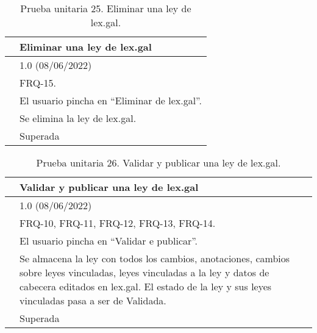 \begin{table}[H]
\begin{center}
\begin{tabular}{|p{3cm}|p{10cm}|} \hline
\centering {\bf PU-25} & Eliminar una ley de lex.gal  \\ \hline\hline
\centering {\bf Versión} & 1.0 (08/06/2022) \\ \hline
\centering {\bf Dependencias} & FRQ-15. \\ \hline
\centering {\bf Descripción} &  El usuario pincha en ``Eliminar de lex.gal''. \\ \hline
\centering {\bf Criterio de aceptación} & Se elimina la ley de lex.gal. \\ \hline
\centering {\bf Estado} & Superada \\ \hline
\end{tabular}
\caption{Prueba unitaria 25. Eliminar una ley de lex.gal.}
\label{enlacePU25}
\end{center}
\end{table}

\begin{table}[H]
\begin{center}
\begin{tabular}{|p{3cm}|p{10cm}|} \hline
\centering {\bf PU-26} & Validar y publicar una ley de lex.gal  \\ \hline\hline
\centering {\bf Versión} & 1.0 (08/06/2022) \\ \hline
\centering {\bf Dependencias} & FRQ-10, FRQ-11, FRQ-12, FRQ-13, FRQ-14. \\ \hline
\centering {\bf Descripción} &  El usuario pincha en ``Validar e publicar''. \\ \hline
\centering {\bf Criterio de aceptación} & Se almacena la ley con todos los cambios, anotaciones, cambios sobre leyes vinculadas, leyes vinculadas a la ley y datos de cabecera editados en lex.gal. El estado de la ley y sus leyes vinculadas pasa a ser de Validada. \\ \hline
\centering {\bf Estado} & Superada \\ \hline
\end{tabular}
\caption{Prueba unitaria 26. Validar y publicar una ley de lex.gal.}
\label{enlacePU26}
\end{center}
\end{table}

